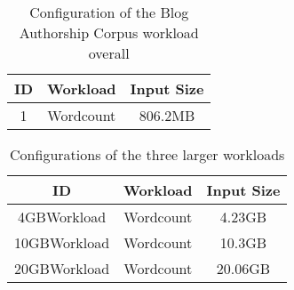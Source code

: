 \documentclass[print,ms]{nuthesis}%
\begin{document}
\begin{table}[H]%
\small
  \begin{center}
     \begin{threeparttable}
    \caption{Configuration of the Blog Authorship Corpus workload overall}
    \label{tab:table4}
    \begin{tabular}{c|c|c}%
     \toprule %
      \textbf{ID} & \textbf{Workload} & \textbf{Input Size}\\
      \hline
      1 & Wordcount & 806.2MB \\
      \bottomrule %
    \end{tabular}
    \begin{tablenotes}
      \small
      \item \textit{ }
    \end{tablenotes}
  \end{threeparttable}
  \end{center}
\end{table}


\begin{table}[H]%
\small
  \begin{center}
     \begin{threeparttable}
    \caption{Configurations of the three larger workloads}
    \label{tab:table4}
    \begin{tabular}{c|c|c}%
     \toprule %
      \textbf{ID} & \textbf{Workload} & \textbf{Input Size}\\
      \hline
      4GBWorkload & Wordcount & 4.23GB\\
      10GBWorkload & Wordcount & 10.3GB\\
      20GBWorkload & Wordcount & 20.06GB\\
      \bottomrule %
    \end{tabular}
    \begin{tablenotes}
      \small
      \item \textit{ }
    \end{tablenotes}
  \end{threeparttable}
  \end{center}
\end{table}
\end{document}
